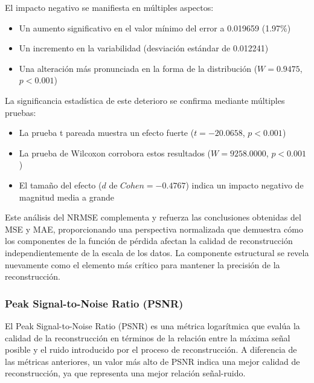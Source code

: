 El impacto negativo se manifiesta en múltiples aspectos:

\begin{itemize}
    \item Un aumento significativo en el valor mínimo del error a 0.019659 (1.97\%)
    \item Un incremento en la variabilidad (desviación estándar de 0.012241)
    \item Una alteración más pronunciada en la forma de la distribución ($W = 0.9475$, $p < 0.001$)
\end{itemize}

La significancia estadística de este deterioro se confirma mediante múltiples pruebas:

\begin{itemize}
    \item La prueba t pareada muestra un efecto fuerte ($t = -20.0658$, $p < 0.001$)
    \item La prueba de Wilcoxon corrobora estos resultados ($W = 9258.0000$, $p < 0.001$)
    \item El tamaño del efecto ($d$ de $Cohen = -0.4767$) indica un impacto negativo de magnitud media a grande
\end{itemize}

Este análisis del NRMSE complementa y refuerza las conclusiones obtenidas del MSE y MAE, proporcionando una perspectiva normalizada que demuestra cómo los componentes de la función de pérdida afectan la calidad de reconstrucción independientemente de la escala de los datos. La componente estructural se revela nuevamente como el elemento más crítico para mantener la precisión de la reconstrucción.




\subsubsection{Peak Signal-to-Noise Ratio (PSNR)}

El Peak Signal-to-Noise Ratio (PSNR) es una métrica logarítmica que evalúa la calidad de la reconstrucción en términos de la relación entre la máxima señal posible y el ruido introducido por el proceso de reconstrucción. A diferencia de las métricas anteriores, un valor más alto de PSNR indica una mejor calidad de reconstrucción, ya que representa una mejor relación señal-ruido.


